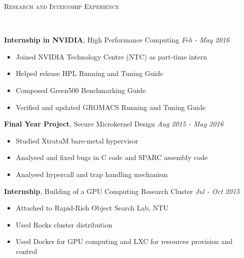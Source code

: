 \documentclass[a4paper, 12pt]{article}
\newenvironment{changemargin}[2]{%
  \begin{list}{}{%
      \setlength{\topsep}{0pt}%
      \setlength{\leftmargin}{#1}%
      \setlength{\rightmargin}{#2}%
      \setlength{\listparindent}{\parindent}%
      \setlength{\itemindent}{\parindent}%
      \setlength{\parsep}{\parskip}%
    }%
  \item[]}{\end{list}
}
\newcommand{\lineover}{
  \begin{changemargin}{-0.05in}{-0.05in}
    \vspace*{-8pt}
    \hrulefill \\
    \vspace*{-2pt}
  \end{changemargin}
}
\newcommand{\header}[1]{
  \begin{changemargin}{-0.6in}{-0.6in}
    \fontsize{15}{15}\scshape{#1}\\
    \lineover
    \vspace*{-4pt}
  \end{changemargin}
}
\newenvironment{body}
{
\vspace*{-16pt}
\begin{changemargin}{-0.25in}{-0.5in}
}
{
\end{changemargin}
}
\begin{document}
\smallskip
\header{Research and Internship Experience}
\begin{body}
  \vspace{14pt}

  \textbf{Internship in NVIDIA}, {High Performance Computing} \hfill \emph{Feb - May 2016}\\
  \vspace*{-6pt}
  \begin{itemize} \itemsep -0pt  \small
  \item Joined NVIDIA Technology Centre (NTC) as part-time intern
  \item Helped release HPL Running and Tuning Guide
  \item Composed Green500 Benchmarking Guide
  \item Verified and updated GROMACS Running and Tuning Guide
  \end{itemize}

  \textbf{Final Year Project}, {Secure Microkernel Design} \hfill \emph{Aug 2015 - May 2016}\\
  \vspace*{-6pt}
  \begin{itemize} \itemsep -0pt  \small
  \item Studied XtratuM bare-metal hypervisor
  \item Analysed and fixed bugs in C code and SPARC assembly code
  \item Analysed hypercall and trap handling mechanism
  \end{itemize}

  \textbf{Internship}, {Building of a GPU Computing Research Cluster} \hfill \emph{Jul - Oct 2015}\\
  \vspace*{-6pt}
  \begin{itemize} \itemsep -0pt  \small
  \item Attached to Rapid-Rich Object Search Lab, NTU
  \item Used Rocks cluster distribution
  \item Used Docker for GPU computing and LXC for resources provision and control
  \end{itemize}


\end{body}
\end{document}
